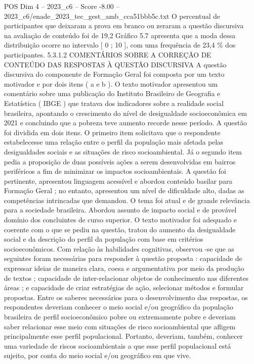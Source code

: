 \begin{textsample}{POS Dim 4 – 2023\_c6 – Score -8.00 – 2023\_c6/enade\_2023\_tec\_gest\_amb\_cca51bbb5c.txt}
O percentual de participantes que deixaram a prova em branco ou zeraram a questão discursiva na avaliação de conteúdo foi de 19,2 Gráfico 5.7 apresenta que a moda dessa distribuição ocorre no intervalo [ 0 ; 10 ], com uma frequência de 23,4 \% dos participantes. 5.3.1.2 COMENTÁRIOS SOBRE A CORREÇÃO DE CONTEÚDO DAS RESPOSTAS À QUESTÃO DISCURSIVA A questão discursiva do componente de Formação Geral foi composta por um texto motivador e por dois itens ( a e b ).
O texto motivador apresentou um comentário sobre uma publicação do Instituto Brasileiro de Geografia e Estatística ( IBGE ) que tratava dos indicadores sobre a realidade social brasileira, apontando o crescimento do nível de desigualdade socioeconômica em 2021 e concluindo que a pobreza teve aumento recorde nesse período.
A questão foi dividida em dois itens.
O primeiro item solicitava que o respondente estabelecesse uma relação entre o perfil da população mais afetada pelas desigualdades sociais e as situações de risco socioambiental.
Já o segundo item pedia a proposição de duas possíveis ações a serem desenvolvidas em bairros periféricos a fim de minimizar os impactos socioambientais.
A questão foi pertinente, apresentou linguagem acessível e abordou conteúdo basilar para Formação Geral ; no entanto, apresentou um nível de dificuldade alto, dadas as competências intrincadas que demandou.
O tema foi atual e de grande relevância para a sociedade brasileira.
Abordou assunto de impacto social e de provável domínio dos concluintes de curso superior.
O texto motivador foi adequado e coerente com o que se pediu na questão, tratou do aumento da desigualdade social e da descrição do perfil da população com base em critérios socioeconômicos.
Com relação às habilidades cognitivas, observou -se que as seguintes foram necessárias para responder à questão proposta : capacidade de expressar ideias de maneira clara, coesa e argumentativa por meio da produção de textos ; capacidade de inter-relacionar objetos de conhecimento nas diferentes áreas ; e capacidade de criar estratégias de ação, selecionar métodos e formular propostas.
Entre os saberes necessários para o desenvolvimento das respostas, os respondentes deveriam conhecer o meio social e/ou geográfico da população brasileira de perfil socioeconômico pobre ou extremamente pobre e deveriam saber relacionar esse meio com situações de risco socioambiental que afligem principalmente esse perfil populacional.
Portanto, deveriam, também, conhecer uma variedade de riscos socioambientais a que esse perfil populacional está sujeito, por conta do meio social e/ou geográfico em que vive.

\end{textsample}
